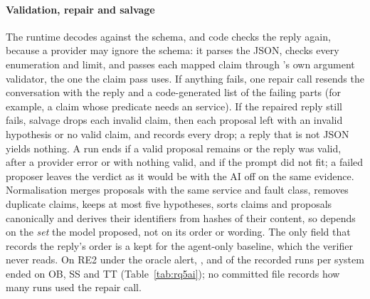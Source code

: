 \paragraph{Validation, repair and salvage}
The runtime decodes against the schema, and code checks the reply again, because a provider may ignore the schema: it parses the JSON, checks every enumeration and limit, and passes each mapped claim through 's own argument validator, the one the claim pass uses.
If anything fails, one repair call resends the conversation with the reply and a code-generated list of the failing parts (for example, a claim whose predicate needs an  service).
If the repaired reply still fails, salvage drops each invalid claim, then each proposal left with an invalid hypothesis or no valid claim, and records every drop; a reply that is not JSON yields nothing.
A run ends  if a valid proposal remains or the reply was valid,  after a provider error or with nothing valid, and  if the prompt did not fit; a failed proposer leaves the verdict as it would be with the AI off on the same evidence.
Normalisation merges proposals with the same service and fault class, removes duplicate claims, keeps at most five hypotheses, sorts claims and proposals canonically and derives their identifiers from hashes of their content, so  depends on the \emph{set} the model proposed, not on its order or wording.
The only field that records the reply's order is a  kept for the agent-only baseline, which the verifier never reads.
On RE2 under the oracle alert, ,  and  of the  recorded  runs per system ended  on OB, SS and TT (Table~\ref{tab:rq5ai}); no committed file records how many runs used the repair call.

